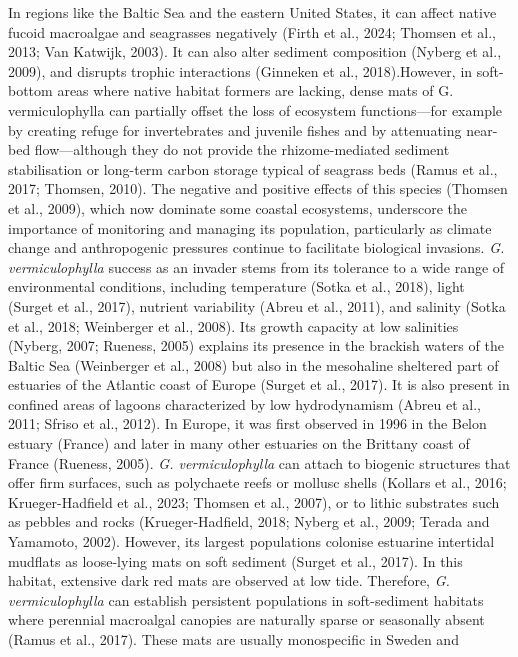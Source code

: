 \documentclass[
  letterpaper,
  DIV=11,
  numbers=noendperiod]{scrartcl}
\begin{document}
In regions like the Baltic Sea and the eastern United States, it can
affect native fucoid macroalgae and seagrasses negatively (Firth et al.,
2024; Thomsen et al., 2013; Van Katwijk, 2003). It can also alter
sediment composition (Nyberg et al., 2009), and disrupts trophic
interactions (Ginneken et al., 2018).However, in soft-bottom areas where
native habitat formers are lacking, dense mats of G. vermiculophylla can
partially offset the loss of ecosystem functions---for example by
creating refuge for invertebrates and juvenile fishes and by attenuating
near-bed flow---although they do not provide the rhizome-mediated
sediment stabilisation or long-term carbon storage typical of seagrass
beds (Ramus et al., 2017; Thomsen, 2010). The negative and positive
effects of this species (Thomsen et al., 2009), which now dominate some
coastal ecosystems, underscore the importance of monitoring and managing
its population, particularly as climate change and anthropogenic
pressures continue to facilitate biological invasions. \emph{G.
vermiculophylla} success as an invader stems from its tolerance to a
wide range of environmental conditions, including temperature (Sotka et
al., 2018), light (Surget et al., 2017), nutrient variability (Abreu et
al., 2011), and salinity (Sotka et al., 2018; Weinberger et al., 2008).
Its growth capacity at low salinities (Nyberg, 2007; Rueness, 2005)
explains its presence in the brackish waters of the Baltic Sea
(Weinberger et al., 2008) but also in the mesohaline sheltered part of
estuaries of the Atlantic coast of Europe (Surget et al., 2017). It is
also present in confined areas of lagoons characterized by low
hydrodynamism (Abreu et al., 2011; Sfriso et al., 2012). In Europe, it
was first observed in 1996 in the Belon estuary (France) and later in
many other estuaries on the Brittany coast of France (Rueness, 2005).
\emph{G. vermiculophylla} can attach to biogenic structures that offer
firm surfaces, such as polychaete reefs or mollusc shells (Kollars et
al., 2016; Krueger-Hadfield et al., 2023; Thomsen et al., 2007), or to
lithic substrates such as pebbles and rocks (Krueger-Hadfield, 2018;
Nyberg et al., 2009; Terada and Yamamoto, 2002). However, its largest
populations colonise estuarine intertidal mudflats as loose-lying mats
on soft sediment (Surget et al., 2017). In this habitat, extensive dark
red mats are observed at low tide. Therefore, \emph{G. vermiculophylla}
can establish persistent populations in soft-sediment habitats where
perennial macroalgal canopies are naturally sparse or seasonally absent
(Ramus et al., 2017). These mats are usually monospecific in Sweden and
\end{document}
